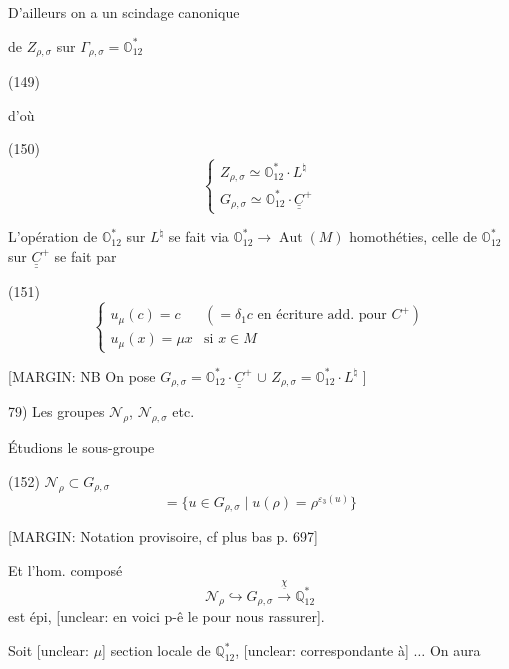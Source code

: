 D'ailleurs on a un scindage canonique

de $Z_{\rho,\sigma}$ sur $\Gamma_{\rho,\sigma} = \mathbb{O}_{12}^*$

(149)

d'où

(150) $$ \begin{cases} Z_{\rho,\sigma} \simeq \mathbb{O}_{12}^* \cdot L^\natural \\ G_{\rho,\sigma} \simeq \mathbb{O}_{12}^* \cdot \underline{\underline{C}}^+ \end{cases} $$

L'opération de $\mathbb{O}_{12}^*$ sur $L^\natural$ se fait
via $\mathbb{O}_{12}^* \to \operatorname{Aut}(M)$ homothéties, celle
de $\mathbb{O}_{12}^*$ sur $\underline{\underline{C}}^+$ se fait par

(151) $$ \begin{cases} u_\mu(c) = c & (= \delta_1 c \text{ en écriture add. pour } C^+) \\ u_\mu(x) = \mu x & \text{si } x \in M \end{cases} $$

[MARGIN:
NB On pose
$G_{\rho,\sigma} = \mathbb{O}_{12}^* \cdot \underline{\underline{C}}^+$
$\cup$
$Z_{\rho,\sigma} = \mathbb{O}_{12}^* \cdot L^\natural$
]

\newpage


79) Les groupes $\mathcal{N}_{\rho}$, $\mathcal{N}_{\rho, \sigma}$ etc.

Étudions le sous-groupe

(152) $\mathcal{N}_{\rho} \subset G_{\rho, \sigma}$
$$= \{ u \in G_{\rho, \sigma} \mid u(\rho) = \rho^{\varepsilon_3(u)} \}$$

[MARGIN: Notation provisoire, cf plus bas p. 697]

Et l'hom. composé
$$\mathcal{N}_{\rho} \hookrightarrow G_{\rho, \sigma} \xrightarrow{\underline{\chi}} \mathbb{Q}_{12}^*$$
est épi, [unclear: en voici p-ê le pour nous rassurer].

Soit [unclear: $\mu$] section locale de $\mathbb{Q}_{12}^*$, [unclear: correspondante à] $\dots$ On aura

